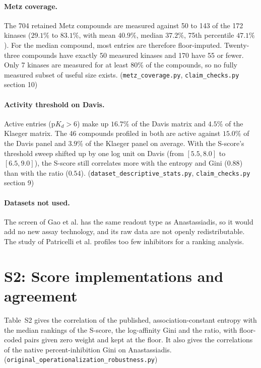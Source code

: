 \documentclass[11pt]{article}
\begin{document}
\paragraph{Metz coverage.} The 704 retained Metz compounds are measured against
50 to 143 of the 172 kinases ($29.1\%$ to $83.1\%$, with mean $40.9\%$, median
$37.2\%$, 75th percentile $47.1\%$). For the median compound, most entries are
therefore floor-imputed. Twenty-three compounds have exactly 50 measured
kinases and 170 have 55 or fewer. Only 7 kinases are measured for at least
$80\%$ of the compounds, so no fully measured subset of useful size exists.
(\texttt{metz\_coverage.py}, \texttt{claim\_checks.py} section 10)

\paragraph{Activity threshold on Davis.} Active entries ($\mathrm{p}K_d > 6$)
make up $16.7\%$ of the Davis matrix and $4.5\%$ of the Klaeger matrix. The 46
compounds profiled in both are active against $15.0\%$ of the Davis panel and
$3.9\%$ of the Klaeger panel on average. With the S-score's threshold sweep
shifted up by one log unit on Davis (from $[5.5, 8.0]$ to $[6.5, 9.0]$), the
S-score still correlates more with the entropy and Gini ($0.88$) than with the
ratio ($0.54$). (\texttt{dataset\_descriptive\_stats.py}, \texttt{claim\_checks.py}
section 9)

\paragraph{Datasets not used.} The screen of Gao et al.\cite{Gao2013} has the same
readout type as Anastassiadis, so it would add no new assay technology, and its
raw data are not openly redistributable. The study of Patricelli et al.\cite{Patricelli2011}
profiles too few inhibitors for a ranking analysis.

\clearpage
\section*{S2: Score implementations and agreement}

Table~S2 gives the correlation of the published, association-constant entropy
with the median rankings of the S-score, the log-affinity Gini and the ratio,
with floor-coded pairs given zero weight and kept at the floor. It also gives
the correlations of the native percent-inhibition Gini on Anastassiadis.
(\texttt{original\_\allowbreak{}operationalization\_\allowbreak{}robustness.py})
\end{document}
